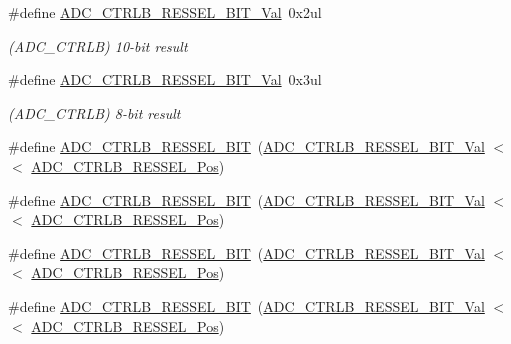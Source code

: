 \begin{DoxyCompactItemize}
\#define \mbox{\hyperlink{group___s_a_m_d21___a_d_c_ga7aae19c0d8276b179805578feb8b24da}{A\+D\+C\+\_\+\+C\+T\+R\+L\+B\+\_\+\+R\+E\+S\+S\+E\+L\+\_\+B\+I\+T\+\_\+\+Val}}~0x2ul
\begin{DoxyCompactList}\small\item\em (A\+D\+C\+\_\+\+C\+T\+R\+LB) 10-\/bit result \end{DoxyCompactList}\item 
\#define \mbox{\hyperlink{group___s_a_m_d21___a_d_c_ga7cdc63d688db409cee2d5d0d2469f7e0}{A\+D\+C\+\_\+\+C\+T\+R\+L\+B\+\_\+\+R\+E\+S\+S\+E\+L\+\_\+B\+I\+T\+\_\+\+Val}}~0x3ul
\begin{DoxyCompactList}\small\item\em (A\+D\+C\+\_\+\+C\+T\+R\+LB) 8-\/bit result \end{DoxyCompactList}\item 
\#define \mbox{\hyperlink{group___s_a_m_d21___a_d_c_gae6d10f3c89163d9d85c9368e9f9188cd}{A\+D\+C\+\_\+\+C\+T\+R\+L\+B\+\_\+\+R\+E\+S\+S\+E\+L\+\_\+B\+IT}}~(\mbox{\hyperlink{group___s_a_m_d21___a_d_c_ga31cc5b803dcceafdd124477c67b10145}{A\+D\+C\+\_\+\+C\+T\+R\+L\+B\+\_\+\+R\+E\+S\+S\+E\+L\+\_\+B\+I\+T\+\_\+\+Val}}    $<$$<$ \mbox{\hyperlink{group___s_a_m_d21___a_d_c_gaf76b4d68e2a72e598663c5de37790510}{A\+D\+C\+\_\+\+C\+T\+R\+L\+B\+\_\+\+R\+E\+S\+S\+E\+L\+\_\+\+Pos}})
\item 
\#define \mbox{\hyperlink{group___s_a_m_d21___a_d_c_ga94cf2de8fb0e54b067a5499de92a5d01}{A\+D\+C\+\_\+\+C\+T\+R\+L\+B\+\_\+\+R\+E\+S\+S\+E\+L\+\_\+B\+IT}}~(\mbox{\hyperlink{group___s_a_m_d21___a_d_c_gadbd375de856d42b6279963f6f10c7697}{A\+D\+C\+\_\+\+C\+T\+R\+L\+B\+\_\+\+R\+E\+S\+S\+E\+L\+\_\+B\+I\+T\+\_\+\+Val}}    $<$$<$ \mbox{\hyperlink{group___s_a_m_d21___a_d_c_gaf76b4d68e2a72e598663c5de37790510}{A\+D\+C\+\_\+\+C\+T\+R\+L\+B\+\_\+\+R\+E\+S\+S\+E\+L\+\_\+\+Pos}})
\item 
\#define \mbox{\hyperlink{group___s_a_m_d21___a_d_c_gacc9209599f18eb1f284a79bbe5e88829}{A\+D\+C\+\_\+\+C\+T\+R\+L\+B\+\_\+\+R\+E\+S\+S\+E\+L\+\_\+B\+IT}}~(\mbox{\hyperlink{group___s_a_m_d21___a_d_c_ga7aae19c0d8276b179805578feb8b24da}{A\+D\+C\+\_\+\+C\+T\+R\+L\+B\+\_\+\+R\+E\+S\+S\+E\+L\+\_\+B\+I\+T\+\_\+\+Val}}    $<$$<$ \mbox{\hyperlink{group___s_a_m_d21___a_d_c_gaf76b4d68e2a72e598663c5de37790510}{A\+D\+C\+\_\+\+C\+T\+R\+L\+B\+\_\+\+R\+E\+S\+S\+E\+L\+\_\+\+Pos}})
\item 
\#define \mbox{\hyperlink{group___s_a_m_d21___a_d_c_ga613253e2ec4ef05c15a599a0ab56e70c}{A\+D\+C\+\_\+\+C\+T\+R\+L\+B\+\_\+\+R\+E\+S\+S\+E\+L\+\_\+B\+IT}}~(\mbox{\hyperlink{group___s_a_m_d21___a_d_c_ga7cdc63d688db409cee2d5d0d2469f7e0}{A\+D\+C\+\_\+\+C\+T\+R\+L\+B\+\_\+\+R\+E\+S\+S\+E\+L\+\_\+B\+I\+T\+\_\+\+Val}}     $<$$<$ \mbox{\hyperlink{group___s_a_m_d21___a_d_c_gaf76b4d68e2a72e598663c5de37790510}{A\+D\+C\+\_\+\+C\+T\+R\+L\+B\+\_\+\+R\+E\+S\+S\+E\+L\+\_\+\+Pos}})

\end{DoxyCompactItemize}
